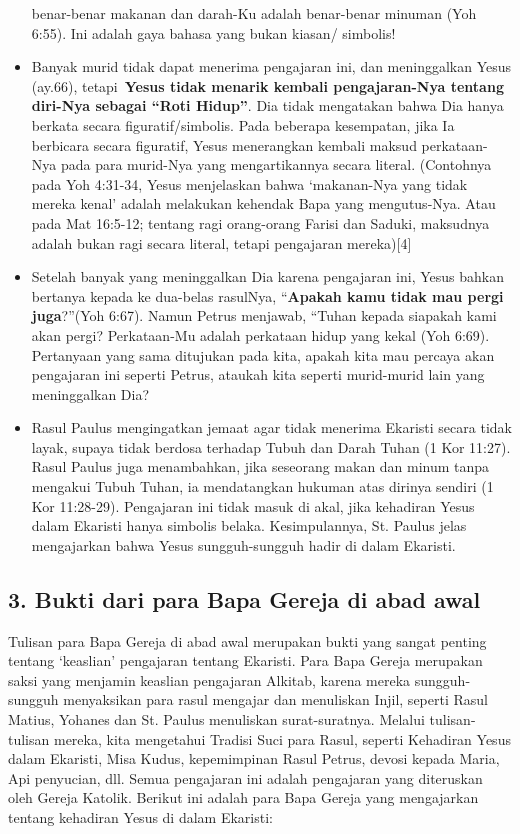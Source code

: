 \begin{itemize}
benar-benar makanan dan darah-Ku adalah benar-benar minuman (Yoh 6:55).
Ini adalah gaya bahasa yang bukan kiasan/ simbolis!
\item Banyak murid tidak dapat menerima pengajaran ini, dan meninggalkan
Yesus (ay.66), tetapi~\textbf{Yesus tidak menarik kembali
pengajaran-Nya tentang diri-Nya sebagai {\textquotedblleft}Roti
Hidup{\textquotedblright}}. Dia tidak mengatakan bahwa Dia hanya
berkata secara figuratif/simbolis. Pada beberapa kesempatan, jika Ia
berbicara secara figuratif, Yesus menerangkan kembali maksud
perkataan-Nya pada para murid-Nya yang mengartikannya secara literal.
(Contohnya pada Yoh 4:31-34, Yesus menjelaskan bahwa
{\textquoteleft}makanan-Nya yang tidak mereka kenal{\textquoteright}
adalah melakukan kehendak Bapa yang mengutus-Nya. Atau pada Mat
16:5-12; tentang ragi orang-orang Farisi dan Saduki, maksudnya adalah
bukan ragi secara literal, tetapi pengajaran mereka)[4]
\item Setelah banyak yang meninggalkan Dia karena pengajaran ini, Yesus
bahkan bertanya kepada ke dua-belas rasulNya,
{\textquotedblleft}\textbf{Apakah kamu tidak mau pergi
juga}?{\textquotedblright}(Yoh 6:67). Namun Petrus menjawab,
{\textquotedblleft}Tuhan kepada siapakah kami akan pergi? Perkataan-Mu
adalah perkataan hidup yang kekal (Yoh 6:69). Pertanyaan yang sama
ditujukan pada kita, apakah kita mau percaya akan pengajaran ini
seperti Petrus, ataukah kita seperti murid-murid lain yang meninggalkan
Dia?
\item Rasul Paulus mengingatkan jemaat agar tidak menerima Ekaristi
secara tidak layak, supaya tidak berdosa terhadap Tubuh dan Darah Tuhan
(1 Kor 11:27). Rasul Paulus juga menambahkan, jika seseorang makan dan
minum tanpa mengakui Tubuh Tuhan, ia mendatangkan hukuman atas dirinya
sendiri (1 Kor 11:28-29). Pengajaran ini tidak masuk di akal, jika
kehadiran Yesus dalam Ekaristi hanya simbolis belaka. Kesimpulannya,
St. Paulus jelas mengajarkan bahwa Yesus sungguh-sungguh hadir di dalam
Ekaristi.
\end{itemize}
\subsection[3. Bukti dari para Bapa Gereja di abad awal]{3. Bukti
dari para Bapa Gereja di abad awal}
Tulisan para Bapa Gereja di abad awal merupakan bukti yang sangat
penting tentang {\textquoteleft}keaslian{\textquoteright} pengajaran
tentang Ekaristi. Para Bapa Gereja merupakan saksi yang menjamin
keaslian pengajaran Alkitab, karena mereka sungguh-sungguh menyaksikan
para rasul mengajar dan menuliskan Injil, seperti Rasul Matius, Yohanes
dan St. Paulus menuliskan surat-suratnya. Melalui tulisan-tulisan
mereka, kita mengetahui Tradisi Suci para Rasul, seperti Kehadiran
Yesus dalam Ekaristi, Misa Kudus, kepemimpinan Rasul Petrus, devosi
kepada Maria, Api penyucian, dll. Semua pengajaran ini adalah
pengajaran yang diteruskan oleh Gereja Katolik. Berikut ini adalah para
Bapa Gereja yang mengajarkan tentang kehadiran Yesus di dalam Ekaristi:

